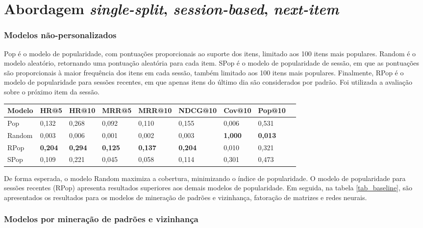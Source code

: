 \section{Abordagem \textit{single-split}, \textit{session-based}, \textit{next-item}}




 

  \subsubsection{Modelos não-personalizados}

  Pop é o modelo de popularidade, com pontuações proporcionais ao suporte dos
  itens, limitado aos 100 itens mais populares. Random é o modelo aleatório,
  retornando uma pontuação aleatória para cada item. SPop é o modelo de
  popularidade de sessão, em que as pontuações são proporcionais à maior
  frequência dos itens em cada sessão, também limitado aos 100 itens mais
  populares. Finalmente, RPop é o modelo de popularidade para sessões recentes,
  em que apenas itens do último dia são considerados por padrão. Foi utilizada a
  avaliação sobre o próximo item da sessão.
\begin{table}[htbp]
  \centering
  \begin{tabular}
    {|l|l|l|l|l|l|l|l|l|}
    \hline
    Modelo & HR@5 & HR@10 & MRR@5 & MRR@10 & NDCG@10 & Cov@10 & Pop@10 \\ \hline
    Pop & 0,132 & 0,268 & 0,092 & 0,110 & 0,155 & 0,006 & 0,531 \\ \hline
    Random & 0,003 & 0,006 & 0,001 & 0,002 & 0,003 & \textbf{1,000} & \textbf{0,013} \\ \hline
    RPop & \textbf{0,204} & \textbf{0,294} & \textbf{0,125} & \textbf{0,137} & \textbf{0,204} & 0,010 & 0,321 \\ \hline
    SPop & 0,109 & 0,221 & 0,045 & 0,058 & 0,114 & 0,301 & 0,473 \\ \hline
  \end{tabular}
\end{table}

De forma esperada, o modelo Random maximiza a cobertura, minimizando o índice de
popularidade. O modelo de popularidade para sessões recentes (RPop) apresenta
resultados superiores aos demais modelos de popularidade.
Em seguida, na tabela \ref{tab_baseline}, são apresentados os resultados para os
modelos de mineração de padrões e vizinhança, fatoração de matrizes e redes neurais.


\subsubsection{Modelos por mineração de padrões e vizinhança}

